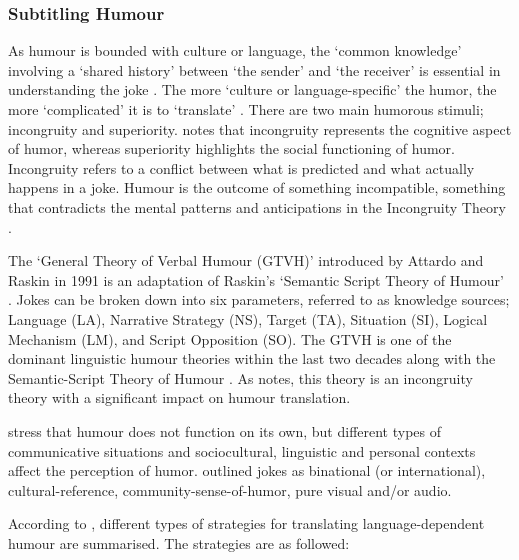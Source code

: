 \documentclass[english]{textolivre}
\begin{document}
\subsubsection{Subtitling Humour}\label{sec-resumo}
As humour is bounded with culture or language, the `common knowledge' involving a `shared history' between `the sender' and `the receiver' is essential in understanding the joke \cite{cheng_chinese_2014}. The more `culture or language-specific' the humor, the more `complicated' it is to `translate' \cite{martinez-sierra_translating_2006}. There are two main humorous stimuli; incongruity and superiority. \textcite{vandaele_humor_2010} notes that incongruity represents the cognitive aspect of humor, whereas superiority highlights the social functioning of humor. Incongruity refers to a conflict between what is predicted and what actually happens in a joke. Humour is the outcome of something incompatible, something that contradicts the mental patterns and anticipations in the Incongruity Theory \cite{ghodsi_relevance-theoretic_2016}. 

The `General Theory of Verbal Humour (GTVH)' introduced by Attardo and Raskin in 1991 is an adaptation of Raskin's `Semantic Script Theory of Humour' \cite{shipley_towards_2007}. Jokes can be broken down into six parameters, referred to as knowledge sources; Language (LA), Narrative Strategy (NS), Target (TA), Situation (SI), Logical Mechanism (LM), and Script Opposition (SO). The GTVH is one of the dominant linguistic humour theories within the last two decades along with the Semantic-Script Theory of Humour \cite{attardo_routledge_2017}. As \textcite{shipley_towards_2007} notes, this theory is an incongruity theory with a significant impact on humour translation. 

\textcite{diaz-cintas_audiovisual_2007} stress that humour does not function on its own, but different types of communicative situations and sociocultural, linguistic and personal contexts affect the perception of humor. \textcite{zabalbeascoa_translating_1996,martinez-sierra_translating_2006,diaz-cintas_audiovisual_2007} outlined jokes as binational (or international), cultural-reference, community-sense-of-humor, pure visual and/or audio.  

According to \textcite{chiaro_verbally_2008}, different types of strategies for translating language-dependent humour are summarised. The strategies are as followed:
\end{document}

